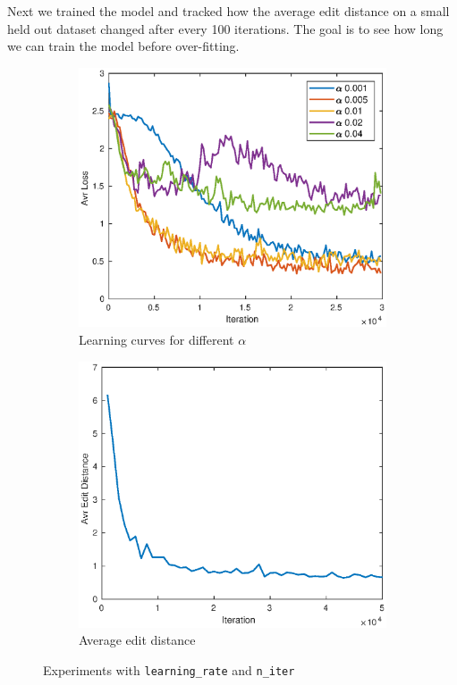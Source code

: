 \documentclass[12pt]{article}
\begin{document}
Next we trained the model and tracked how the average edit distance on a small held out dataset changed after every 100 iterations. The goal is to see how long we can train the model before over-fitting.

\begin{figure}[t!]
    \begin{subfigure}[t]{0.5\textwidth}
        \centering
        \includegraphics[width=\linewidth]{img/learning_rate2.eps}
        \caption{Learning curves for different $\alpha$}
        \label{fig_learning_rate}
    \end{subfigure}
    \begin{subfigure}[t]{0.5\textwidth}
        \centering
        \includegraphics[width=\linewidth]{img/n_iter_dist_3.eps}
        \caption{Average edit distance}
        \label{fig_n_iter}
    \end{subfigure}
	\caption{Experiments with \texttt{learning\_rate} and \texttt{n\_iter}}
	\label{fig_train_param}
\end{figure}
\end{document}
